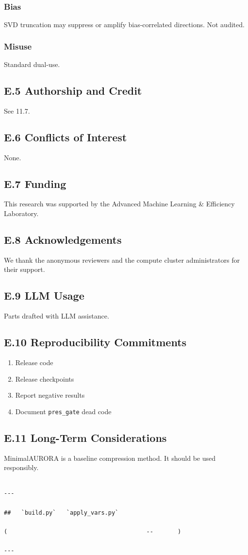 \subsubsection{Bias}

SVD truncation may suppress or amplify bias-correlated directions. 
Not audited.

\subsubsection{Misuse}

Standard dual-use.

\subsection{E.5 Authorship and Credit}

See  11.7.

\subsection{E.6 Conflicts of Interest}

None.

\subsection{E.7 Funding}

This research was supported by the Advanced Machine Learning \& Efficiency Laboratory.

\subsection{E.8 Acknowledgements}

We thank the anonymous reviewers and the compute cluster administrators for their support.

\subsection{E.9 LLM Usage}

Parts drafted with LLM assistance.

\subsection{E.10 Reproducibility Commitments}

\begin{enumerate}
\item Release code
\item Release checkpoints
\item Report negative results
\item Document \texttt{pres\_gate} dead code

\end{enumerate}
\subsection{E.11 Long-Term Considerations}

MinimalAURORA is a baseline compression method. It should be used 
responsibly.
\begin{lstlisting}

---

##   `build.py`   `apply_vars.py`

(                                        --       )

---
\end{lstlisting}